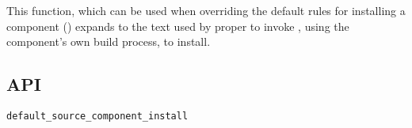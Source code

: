This function, which can be used when overriding the default rules for
installing a component () expands to the text used
by \lmsbw proper to invoke \make, using the component's own build
process, to install.

\subsection{API}

\begin{verbatim}
default_source_component_install
\end{verbatim}
